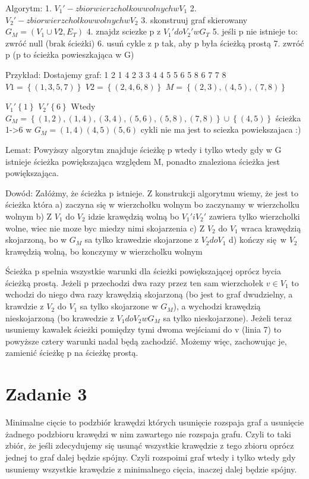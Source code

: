 \documentclass[12pt]{article}
\newcommand{\set}[1]{\left \{ #1 \right \}}				%
\begin{document}
Algorytm:
1. $V_1' - zbior wierzcholkow wolnych w V_1$
2. $V_2' - zbior wierzcholkow wolnych w V_2$
3. skonstruuj graf skierowany $G_M = (V_1 \cup V2, E_T)$
4. znajdz sciezke p z $V_1' do V_2' w G_T$
5. jeśli p nie istnieje to:
    zwróć null (brak ścieżki)
6. usuń cykle z p tak, aby p była ścieżką prostą
7. zwróć p (p to ścieżka powieszkająca w G)

Przykład:
Dostajemy graf:
1 2
1 4
2 3
3 4
4 5
5 6
5 8
6 7
7 8
$V1 = \set{(1, 3, 5, 7)}$
$V2 = \set{(2, 4, 6, 8)}$
$M = \set{(2, 3), (4, 5), (7, 8)}$

$V_1' \set{1}$
$V_2' \set{6}$
Wtedy $G_M = \set{(1, 2), (1,4),(3, 4),(5,6),(5,8),(7,8)} \cup \set{(4,5)}$
ścieżka 1->6 w $G_M = (1,4)(4,5)(5,6)$
cykli nie ma 
jest to sciezka powiekszajaca :)

Lemat:
Powyższy algorytm znajduje ścieżkę p wtedy i tylko wtedy gdy w G istnieje ścieżka powiększająca względem M, ponadto znaleziona ścieżka jest powiększająca.

Dowód:
Załóżmy, że ścieżka p istnieje. Z konstrukcji algorytmu wiemy, że jest to ścieżka która 
a) zaczyna się w wierzchołku wolnym bo zaczynamy w wierzcholku wolnym
b) Z $V_1$ do $V_2$ idzie krawędzią wolną bo $V_1' i V_2'$ zawiera tylko wierzcholki wolne, wiec nie moze byc miedzy nimi skojarzenia
c) Z $V_2$ do $V_1$ wraca krawędzią skojarzoną, bo w $G_M$ sa tylko krawedzie skojarzone z $V_2 do V_1$
d) kończy się w $V_2$ krawędzią wolną, bo konczymy w wierzcholku wolnym

Ścieżka p spełnia wszystkie warunki dla ścieżki powiększającej oprócz bycia ścieżką prostą. Jeżeli p przechodzi dwa razy przez ten sam wierzchołek $v \in V_1$ to wchodzi do niego dwa razy krawędzią skojarzoną (bo jest to graf dwudzielny, a krawdzie z $V_2$ do $V_1$ sa tylko skojarzone w $G_M$), a wychodzi krawędzią nieskojarzoną (bo krawedzie z $V_1 do V_2 w G_M$ sa tylko nieskojarzone). Jeżeli teraz usuniemy kawałek ścieżki pomiędzy tymi dwoma wejściami do v (linia 7) to powyższe cztery warunki nadal będą zachodzić. Możemy więc, zachowując je, zamienić ścieżkę p na ścieżkę prostą.

\section{Zadanie 3} %

Minimalne cięcie to podzbiór krawędzi których usunięcie rozspaja graf a usunięcie żadnego podzbioru krawędzi w nim zawartego nie rozspaja grafu. Czyli to taki zbiór, że jeśli zdecydujemy się usunąć wszystkie krawędzie z tego zbioru oprócz jednej to graf dalej będzie spójny. Czyli rozspoimi graf wtedy i tylko wtedy gdy usuniemy wszystkie krawędzie z minimalnego cięcia, inaczej dalej będzie spójny.
\end{document}
